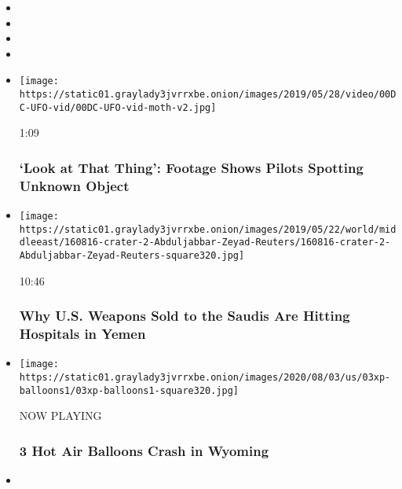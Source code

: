 \begin{itemize}
\item
\item
\item
\item
\end{itemize}

\begin{itemize}
\item
  \href{https://www.nytimes3xbfgragh.onion/video/us/100000006525294/ufo-video-navy.html?action=click\&module=video-series-bar\&region=header\&pgtype=Article\&playlistId=video/u-s}{}

  \texttt{[image: https://static01.graylady3jvrrxbe.onion/images/2019/05/28/video/00DC-UFO-vid/00DC-UFO-vid-moth-v2.jpg]}

  1:09

  \hypertarget{look-at-that-thing-footage-shows-pilots-spotting-unknown-object}{%
  \subsubsection{`Look at That Thing': Footage Shows Pilots Spotting
  Unknown
  Object}\label{look-at-that-thing-footage-shows-pilots-spotting-unknown-object}}
\item
  \href{https://www.nytimes3xbfgragh.onion/video/world/middleeast/100000006466384/yemen-war-saudi-arabia-usa.html?action=click\&module=video-series-bar\&region=header\&pgtype=Article\&playlistId=video/u-s}{}

  \texttt{[image: https://static01.graylady3jvrrxbe.onion/images/2019/05/22/world/middleeast/160816-crater-2-Abduljabbar-Zeyad-Reuters/160816-crater-2-Abduljabbar-Zeyad-Reuters-square320.jpg]}

  10:46

  \hypertarget{why-us-weapons-sold-to-the-saudis-are-hitting-hospitals-in-yemen}{%
  \subsubsection{Why U.S. Weapons Sold to the Saudis Are Hitting
  Hospitals in
  Yemen}\label{why-us-weapons-sold-to-the-saudis-are-hitting-hospitals-in-yemen}}
\item
  \texttt{[image: https://static01.graylady3jvrrxbe.onion/images/2020/08/03/us/03xp-balloons1/03xp-balloons1-square320.jpg]}

  NOW PLAYING

  \hypertarget{3-hot-air-balloons-crash-in-wyoming-2}{%
  \subsubsection{3 Hot Air Balloons Crash in
  Wyoming}\label{3-hot-air-balloons-crash-in-wyoming-2}}
\item
  \href{https://www.nytimes3xbfgragh.onion/video/us/100000007271181/california-virus-cases-trend-down.html?action=click\&module=video-series-bar\&region=header\&pgtype=Article\&playlistId=video/u-s}{}


\end{itemize}
